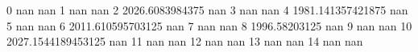 0 nan nan
1 nan nan
2 2026.6083984375 nan
3 nan nan
4 1981.141357421875 nan
5 nan nan
6 2011.610595703125 nan
7 nan nan
8 1996.58203125 nan
9 nan nan
10 2027.1544189453125 nan
11 nan nan
12 nan nan
13 nan nan
14 nan nan
